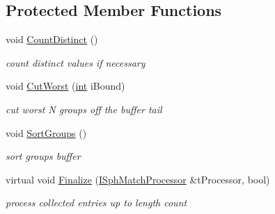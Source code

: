 \subsection*{Protected Member Functions}
\begin{DoxyCompactItemize}
\item 
void \hyperlink{classCSphKBufferGroupSorter_a8791894f12a1b5dcfe52b33d45d704f9}{Count\-Distinct} ()
\begin{DoxyCompactList}\small\item\em count distinct values if necessary \end{DoxyCompactList}\item 
void \hyperlink{classCSphKBufferGroupSorter_ab9849eca27c2f7fa72c2d1709c0dc1d7}{Cut\-Worst} (\hyperlink{sphinxexpr_8cpp_a4a26e8f9cb8b736e0c4cbf4d16de985e}{int} i\-Bound)
\begin{DoxyCompactList}\small\item\em cut worst N groups off the buffer tail \end{DoxyCompactList}\item 
void \hyperlink{classCSphKBufferGroupSorter_a0024d7a39f6d2635d6f48fdeef13b343}{Sort\-Groups} ()
\begin{DoxyCompactList}\small\item\em sort groups buffer \end{DoxyCompactList}\item 
virtual void \hyperlink{classCSphKBufferGroupSorter_a7c5d1619189c058527bfed44919a59bf}{Finalize} (\hyperlink{structISphMatchProcessor}{I\-Sph\-Match\-Processor} \&t\-Processor, bool)
\begin{DoxyCompactList}\small\item\em process collected entries up to length count \end{DoxyCompactList}\end{DoxyCompactItemize}
